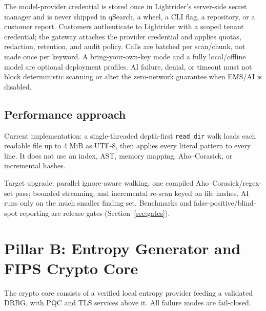 \documentclass[10pt]{article}
\newcommand{\code}[1]{\texttt{\small #1}}
\begin{document}
The model-provider credential is stored once in Lightrider's server-side secret manager
and is never shipped in qSearch, a wheel, a CLI flag, a repository, or a customer report.
Customers authenticate to Lightrider with a scoped tenant credential; the gateway attaches
the provider credential and applies quotas, redaction, retention, and audit policy. Calls
are batched per scan/chunk, not made once per keyword. A bring-your-own-key mode and a
fully local/offline model are optional deployment profiles. AI failure, denial, or timeout
must not block deterministic scanning or alter the zero-network guarantee when EMS/AI is
disabled.

\subsection{Performance approach}
Current implementation: a single-threaded depth-first \code{read\_dir} walk loads each
readable file up to 4 MiB as UTF-8, then applies every literal pattern to every line. It
does not use an index, AST, memory mapping, Aho--Corasick, or incremental hashes.

Target upgrade: parallel ignore-aware walking; one compiled Aho--Corasick/regex-set pass;
bounded streaming; and incremental re-scan keyed on file hashes. AI runs only on the much
smaller finding set. Benchmarks and false-positive/blind-spot reporting are release gates
(Section~\ref{sec:gates}).

\section{Pillar B: Entropy Generator and FIPS Crypto Core}\label{sec:core}

The crypto core consists of a verified local entropy provider feeding a validated DRBG,
with PQC and TLS services above it. All failure modes are fail-closed.
\end{document}
